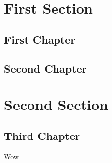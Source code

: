 \documentclass[a4paper, notitlepage]{report}
\author{Eoin Houlihan}
\date{\today}
\title{}
\begin{document}
\inserttitlepage
{}
\declaration
\permissiontolend
\insertabstract
\acknowledgements
\tableofcontents
\newpage
{}

\part{First Section}
\label{sec:org363f0eb}
\chapter{First Chapter}
\label{sec:orga4cbef5}
\chapter{Second Chapter}
\label{sec:orgc3190b8}

\part{Second Section}
\label{sec:org3233abf}
\chapter{Third Chapter}
\label{sec:org2c9524a}
Wow \cite{McKinna_2006}


\appendix
\end{document}
